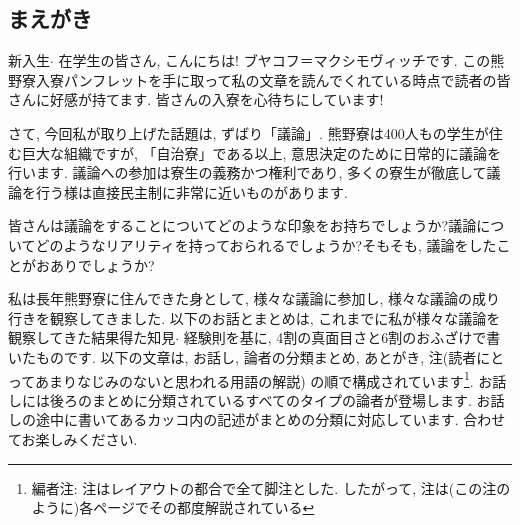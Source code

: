 \documentclass[10pt,b5jsbook,dvips,dvipdfmx,openany]{jsbook}
\theoremstyle{definition}
\begin{document}
		\subsection{まえがき}
		新入生$ \cdot $ 在学生の皆さん, こんにちは! ブヤコフ＝マクシモヴィッチです. この熊野寮入寮パンフレットを手に取って私の文章を読んでくれている時点で読者の皆さんに好感が持てます. 皆さんの入寮を心待ちにしています! 

		さて, 今回私が取り上げた話題は, ずばり「議論」. 熊野寮は400人もの学生が住む巨大な組織ですが, 「自治寮」である以上, 意思決定のために日常的に議論を行います. 議論への参加は寮生の義務かつ権利であり, 多くの寮生が徹底して議論を行う様は直接民主制に非常に近いものがあります. 

		皆さんは議論をすることについてどのような印象をお持ちでしょうか?議論についてどのようなリアリティを持っておられるでしょうか?そもそも, 議論をしたことがおありでしょうか?

		私は長年熊野寮に住んできた身として, 様々な議論に参加し, 様々な議論の成り行きを観察してきました. 以下のお話とまとめは, これまでに私が様々な議論を観察してきた結果得た知見$ \cdot $ 経験則を基に, 4割の真面目さと6割のおふざけで書いたものです. 以下の文章は, お話し, 論者の分類まとめ, あとがき, 注(読者にとってあまりなじみのないと思われる用語の解説) の順で構成されています\footnote{編者注: 注はレイアウトの都合で全て脚注とした. したがって, 注は(この注のように)各ページでその都度解説されている}. お話しには後ろのまとめに分類されているすべてのタイプの論者が登場します. お話しの途中に書いてあるカッコ内の記述がまとめの分類に対応しています. 合わせてお楽しみください. 
\end{document}

